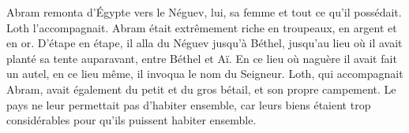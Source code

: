 Abram remonta d’Égypte vers le Néguev,
	lui, sa femme et tout ce qu’il possédait.
	Loth l’accompagnait.
Abram était extrêmement riche en troupeaux, en argent et en or.
D’étape en étape, il alla du Néguev jusqu’à Béthel,
	jusqu’au lieu où il avait planté sa tente auparavant,
		entre Béthel et Aï.
En ce lieu où naguère il avait fait un autel,
	en ce lieu même, il invoqua le nom du Seigneur.
Loth, qui accompagnait Abram,
	avait également du petit et du gros bétail, et son propre campement.
Le pays ne leur permettait pas d’habiter ensemble,
	car leurs biens étaient trop considérables
		pour qu’ils puissent habiter ensemble.
